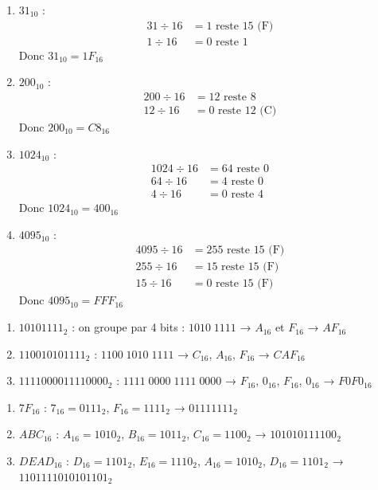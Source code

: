 \begin{enumerate}
    \item $31_{10}$ :
    \begin{align*}
        31 \div 16 &= 1 \text{ reste } 15 \text{ (F)} \\
        1 \div 16 &= 0 \text{ reste } 1
    \end{align*}
    Donc $31_{10} = 1F_{16}$
    
    \item $200_{10}$ :
    \begin{align*}
        200 \div 16 &= 12 \text{ reste } 8 \\
        12 \div 16 &= 0 \text{ reste } 12 \text{ (C)}
    \end{align*}
    Donc $200_{10} = C8_{16}$
    
    \item $1024_{10}$ :
    \begin{align*}
        1024 \div 16 &= 64 \text{ reste } 0 \\
        64 \div 16 &= 4 \text{ reste } 0 \\
        4 \div 16 &= 0 \text{ reste } 4
    \end{align*}
    Donc $1024_{10} = 400_{16}$
    
    \item $4095_{10}$ :
    \begin{align*}
        4095 \div 16 &= 255 \text{ reste } 15 \text{ (F)} \\
        255 \div 16 &= 15 \text{ reste } 15 \text{ (F)} \\
        15 \div 16 &= 0 \text{ reste } 15 \text{ (F)}
    \end{align*}
    Donc $4095_{10} = FFF_{16}$
\end{enumerate}

\begin{enumerate}
    \item $10101111_2$ : on groupe par 4 bits : $1010\;1111$ → $A_{16}$ et $F_{16}$ → $AF_{16}$
    \item $110010101111_2$ : $1100\;1010\;1111$ → $C_{16}$, $A_{16}$, $F_{16}$ → $CAF_{16}$
    \item $1111000011110000_2$ : $1111\;0000\;1111\;0000$ → $F_{16}$, $0_{16}$, $F_{16}$, $0_{16}$ → $F0F0_{16}$
\end{enumerate}

\begin{enumerate}
    \item $7F_{16}$ : $7_{16} = 0111_2$, $F_{16} = 1111_2$ → $01111111_2$
    \item $ABC_{16}$ : $A_{16}=1010_2$, $B_{16}=1011_2$, $C_{16}=1100_2$ → $101010111100_2$
    \item $DEAD_{16}$ : $D_{16}=1101_2$, $E_{16}=1110_2$, $A_{16}=1010_2$, $D_{16}=1101_2$ → $1101111010101101_2$
\end{enumerate}

